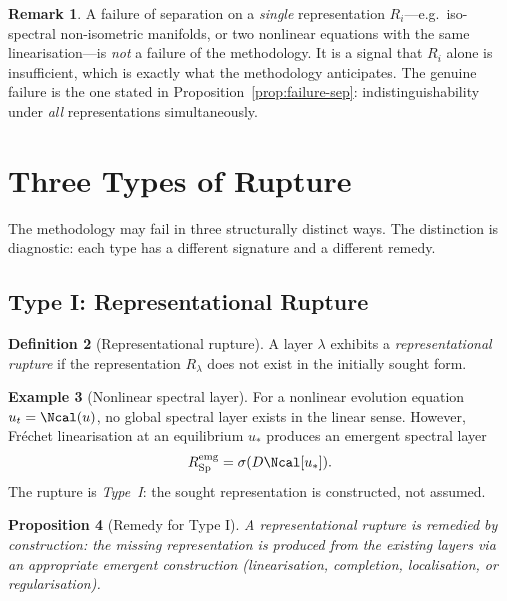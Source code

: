 \documentclass[11pt,a4paper]{article}
\theoremstyle{definition}
\newtheorem{definition}{Definition}[section]
\newtheorem{example}[definition]{Example}
\newtheorem{remark}[definition]{Remark}
\theoremstyle{plain}
\newtheorem{proposition}[definition]{Proposition}
\newcommand{\Sp}{\mathrm{Sp}}
\newcommand{\spec}{\sigma}
\begin{document}
\begin{remark}
A failure of separation on a \emph{single} representation
$R_i$---e.g.\ iso-spectral non-isometric manifolds, or two
nonlinear equations with the same linearisation---is \emph{not} a
failure of the methodology. It is a signal that $R_i$ alone is
insufficient, which is exactly what the methodology anticipates.
The genuine failure is the one stated in
Proposition~\ref{prop:failure-sep}: indistinguishability under
\emph{all} representations simultaneously.
\end{remark}

\section{Three Types of Rupture}
\label{sec:rupture}

The methodology may fail in three structurally distinct ways. The
distinction is diagnostic: each type has a different signature and
a different remedy.

\subsection{Type I: Representational Rupture}

\begin{definition}[Representational rupture]\label{def:rupture-I}
A layer $\lambda$ exhibits a \emph{representational rupture} if the
representation $R_\lambda$ does not exist in the initially sought
form.
\end{definition}

\begin{example}[Nonlinear spectral layer]
For a nonlinear evolution equation $u_t = \Ncal(u)$, no global
spectral layer exists in the linear sense. However, Fr\'echet
linearisation at an equilibrium $u_\ast$ produces an emergent
spectral layer
\[
  R_\Sp^{\rm emg} = \spec(D\Ncal[u_\ast]).
\]
The rupture is \emph{Type~I}: the sought representation is
constructed, not assumed.
\end{example}

\begin{proposition}[Remedy for Type I]\label{prop:remedy-I}
A representational rupture is remedied by construction: the missing
representation is produced from the existing layers via an
appropriate emergent construction (linearisation, completion,
localisation, or regularisation).
\end{proposition}
\end{document}
